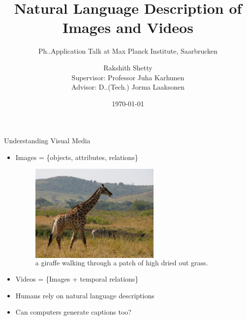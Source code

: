 \documentclass{beamer}
\begin{document}

\title{Natural Language Description of \\Images and Videos}
\subtitle{Ph.\@D.\@ Application Talk at Max Planck Institute, Saarbrucken}
\author[Rakshith Shetty]{Rakshith Shetty\\[4mm] {\small Supervisor: Professor Juha Karhunen\\ Advisor: D.\@Sc.\@ (Tech.\@) Jorma Laaksonen}}
\date{\today}

\frame{\titlepage} 


\begin{frame}{Understanding Visual Media}
  \begin{itemize}
  \item<1-> Images = \{objects, attributes, relations\}\\
  \begin{figure}[h]
    \begin{columns}
    \hfill\includegraphics[width=0.6\textwidth]{images/COCO_train2014_000000544856.jpg}
    \hspace{-5mm}
    \centering
    \caption{a giraffe walking through a patch of high dried out grass.}
    \end{columns}
  \end{figure}
  \item<1->Videos = \{Images + temporal relations\}\\[4mm]
  \item<1->Humans rely on natural language descriptions
  \item<1->Can computers generate captions too?
  \end{itemize}
\end{frame}
\end{document}
